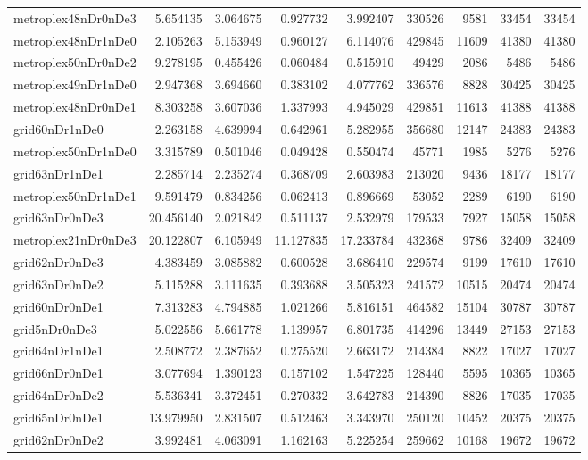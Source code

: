 \begin{longtable}{|l|r|r|r|r|r|r|r|r|}
metroplex48nDr0nDe3 & 5.654135 & 3.064675 & 0.927732 & 3.992407 & 330526 & 9581 & 33454 & 33454 \\
metroplex48nDr1nDe0 & 2.105263 & 5.153949 & 0.960127 & 6.114076 & 429845 & 11609 & 41380 & 41380 \\
metroplex50nDr0nDe2 & 9.278195 & 0.455426 & 0.060484 & 0.515910 & 49429 & 2086 & 5486 & 5486 \\
metroplex49nDr1nDe0 & 2.947368 & 3.694660 & 0.383102 & 4.077762 & 336576 & 8828 & 30425 & 30425 \\
metroplex48nDr0nDe1 & 8.303258 & 3.607036 & 1.337993 & 4.945029 & 429851 & 11613 & 41388 & 41388 \\
grid60nDr1nDe0 & 2.263158 & 4.639994 & 0.642961 & 5.282955 & 356680 & 12147 & 24383 & 24383 \\
metroplex50nDr1nDe0 & 3.315789 & 0.501046 & 0.049428 & 0.550474 & 45771 & 1985 & 5276 & 5276 \\
grid63nDr1nDe1 & 2.285714 & 2.235274 & 0.368709 & 2.603983 & 213020 & 9436 & 18177 & 18177 \\
metroplex50nDr1nDe1 & 9.591479 & 0.834256 & 0.062413 & 0.896669 & 53052 & 2289 & 6190 & 6190 \\
grid63nDr0nDe3 & 20.456140 & 2.021842 & 0.511137 & 2.532979 & 179533 & 7927 & 15058 & 15058 \\
metroplex21nDr0nDe3 & 20.122807 & 6.105949 & 11.127835 & 17.233784 & 432368 & 9786 & 32409 & 32409 \\
grid62nDr0nDe3 & 4.383459 & 3.085882 & 0.600528 & 3.686410 & 229574 & 9199 & 17610 & 17610 \\
grid63nDr0nDe2 & 5.115288 & 3.111635 & 0.393688 & 3.505323 & 241572 & 10515 & 20474 & 20474 \\
grid60nDr0nDe1 & 7.313283 & 4.794885 & 1.021266 & 5.816151 & 464582 & 15104 & 30787 & 30787 \\
grid5nDr0nDe3 & 5.022556 & 5.661778 & 1.139957 & 6.801735 & 414296 & 13449 & 27153 & 27153 \\
grid64nDr1nDe1 & 2.508772 & 2.387652 & 0.275520 & 2.663172 & 214384 & 8822 & 17027 & 17027 \\
grid66nDr0nDe1 & 3.077694 & 1.390123 & 0.157102 & 1.547225 & 128440 & 5595 & 10365 & 10365 \\
grid64nDr0nDe2 & 5.536341 & 3.372451 & 0.270332 & 3.642783 & 214390 & 8826 & 17035 & 17035 \\
grid65nDr0nDe1 & 13.979950 & 2.831507 & 0.512463 & 3.343970 & 250120 & 10452 & 20375 & 20375 \\
grid62nDr0nDe2 & 3.992481 & 4.063091 & 1.162163 & 5.225254 & 259662 & 10168 & 19672 & 19672 \\

\end{longtable}
